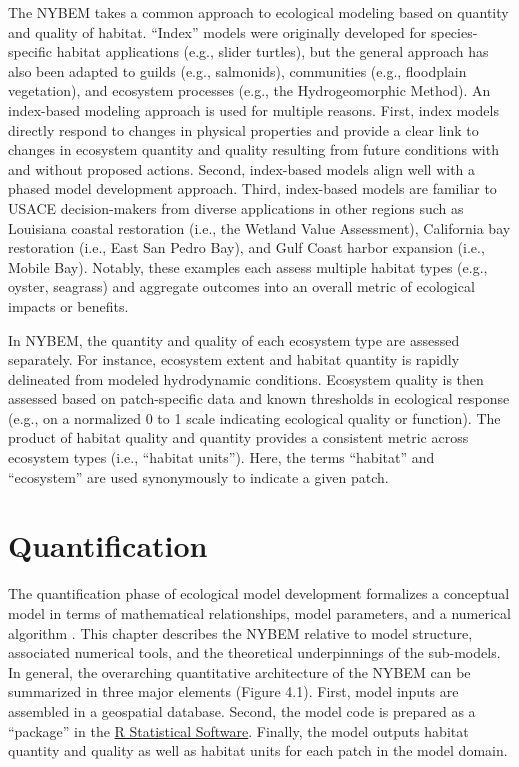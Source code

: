 \documentclass[
]{book}
\begin{document}
The NYBEM takes a common approach to ecological modeling based on quantity and quality of habitat. ``Index'' models \citep{swannack_ecological_2012} were originally developed for species-specific habitat applications (e.g., slider turtles), but the general approach has also been adapted to guilds (e.g., salmonids), communities (e.g., floodplain vegetation), and ecosystem processes (e.g., the Hydrogeomorphic Method). An index-based modeling approach is used for multiple reasons. First, index models directly respond to changes in physical properties and provide a clear link to changes in ecosystem quantity and quality resulting from future conditions with and without proposed actions. Second, index-based models align well with a phased model development approach. Third, index-based models are familiar to USACE decision-makers from diverse applications in other regions such as Louisiana coastal restoration (i.e., the Wetland Value Assessment), California bay restoration (i.e., East San Pedro Bay), and Gulf Coast harbor expansion (i.e., Mobile Bay). Notably, these examples each assess multiple habitat types (e.g., oyster, seagrass) and aggregate outcomes into an overall metric of ecological impacts or benefits.

In NYBEM, the quantity and quality of each ecosystem type are assessed separately. For instance, ecosystem extent and habitat quantity is rapidly delineated from modeled hydrodynamic conditions. Ecosystem quality is then assessed based on patch-specific data and known thresholds in ecological response (e.g., on a normalized 0 to 1 scale indicating ecological quality or function). The product of habitat quality and quantity provides a consistent metric across ecosystem types (i.e., ``habitat units''). Here, the terms ``habitat'' and ``ecosystem'' are used synonymously to indicate a given patch.

\hypertarget{quantification}{%
\chapter{Quantification}\label{quantification}}

The quantification phase of ecological model development formalizes a conceptual model in terms of mathematical relationships, model parameters, and a numerical algorithm \citep{grant_ecological_2008}. This chapter describes the NYBEM relative to model structure, associated numerical tools, and the theoretical underpinnings of the sub-models. In general, the overarching quantitative architecture of the NYBEM can be summarized in three major elements (Figure 4.1). First, model inputs are assembled in a geospatial database. Second, the model code is prepared as a ``package'' in the \href{https://cran.r-project.org/}{R Statistical Software}. Finally, the model outputs habitat quantity and quality as well as habitat units for each patch in the model domain.
\end{document}
